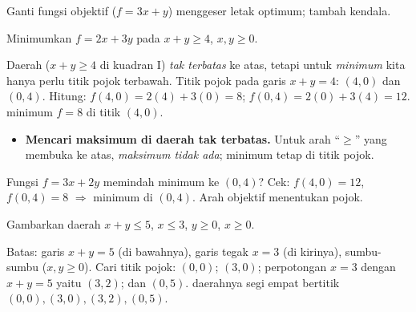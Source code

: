 \begin{variasi}
Ganti fungsi objektif ($f=3x+y$) menggeser letak optimum; tambah kendala.
\end{variasi}

\begin{soalbox}{}
Minimumkan $f=2x+3y$ pada $x+y\ge4$, $x,y\ge0$.
\end{soalbox}

\jawab
{} Daerah ($x+y\ge4$ di kuadran I) \emph{tak terbatas} ke atas, tetapi
untuk \emph{minimum} kita hanya perlu titik pojok terbawah.
 Titik pojok pada garis $x+y=4$: $(4,0)$ dan $(0,4)$.
 Hitung: $f(4,0)=2(4)+3(0)=8$; $f(0,4)=2(0)+3(4)=12$.
\jadi minimum $f=8$ di titik $(4,0)$.

\begin{jebakan}
\begin{itemize}[leftmargin=*,topsep=2pt]
  \item \textbf{Mencari maksimum di daerah tak terbatas.} Untuk arah ``$\ge$''
  yang membuka ke atas, \emph{maksimum tidak ada}; minimum tetap di titik pojok.
\end{itemize}
\end{jebakan}

\begin{variasi}
Fungsi $f=3x+2y$ memindah minimum ke $(0,4)$? Cek: $f(4,0)=12$, $f(0,4)=8$
$\Rightarrow$ minimum di $(0,4)$. Arah objektif menentukan pojok.
\end{variasi}

\begin{soalbox}{}
Gambarkan daerah $x+y\le5$, $x\le3$, $y\ge0$, $x\ge0$.
\end{soalbox}

\jawab
{} Batas: garis $x+y=5$ (di bawahnya), garis tegak $x=3$ (di kirinya),
sumbu-sumbu ($x,y\ge0$).
 Cari titik pojok: $(0,0)$; $(3,0)$; perpotongan $x=3$ dengan
$x+y=5$ yaitu $(3,2)$; dan $(0,5)$.
\jadi daerahnya segi empat bertitik $(0,0),(3,0),(3,2),(0,5)$.

\begin{center}
\end{center}

